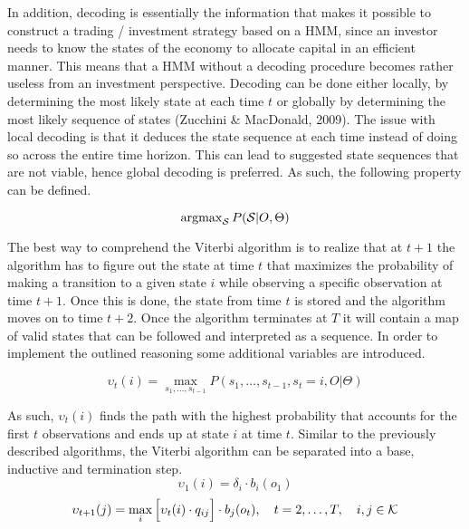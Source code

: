 In addition, decoding is essentially the information that makes it possible to construct a trading / investment strategy based on a HMM, since an investor needs to know the states of the economy to allocate capital in an efficient manner. This means that a HMM without a decoding procedure becomes rather useless from an investment perspective. Decoding can be done either locally, by determining the most likely state at each time $t$ or globally by determining the most likely sequence of states (Zucchini \& MacDonald, 2009). The issue with local decoding is that it deduces the state sequence at each time instead of doing so across the entire time horizon. This can lead to suggested state sequences that are not viable, hence global decoding is preferred. As such, the following property can be defined.

\begin{equation}
    \operatorname{argmax}_{\mathcal{S}}P(\mathcal{S}|O, \Theta)
    \label{eq: global decoding}
\end{equation}

The best way to comprehend the Viterbi algorithm is to realize that at $t+1$ the algorithm has to figure out the state at time $t$ that maximizes the probability of making a transition to a given state $i$ while observing a specific observation at time $t+1$. Once this is done, the state from time $t$ is stored and the algorithm moves on to time $t+2$. Once the algorithm terminates at $T$ it will contain a map of valid states that can be followed and interpreted as a sequence. In order to implement the outlined reasoning some additional variables are introduced.

\begin{equation}
    \upsilon_t(i) =   \max_{s_1,\ldots,s_{t-1}} P(s_1,\ldots,s_{t-1}, s_t=i, O | \Theta)
\end{equation}

As such, $\upsilon_t(i)$ finds the path with the highest probability that accounts for the first $t$ observations and ends up at state $i$ at time $t$. Similar to the previously described algorithms, the Viterbi algorithm can be separated into a base, inductive and termination step.
\begin{equation}
    \upsilon_1(i) = \delta_i \cdot b_i(o_1)
    \label{eq: viterbi start 1}
\end{equation}
\begin{equation}
    \upsilon_{t+1}(j) = \max_{i}\Big[\upsilon_t(i) \cdot q_{ij}\Big] \cdot b_j(o_t),
    \quad t=2,\ldots,T , \quad i,j \in \operatorname{\mathcal{K}} 
    \label{eq: inductive viterbi}
\end{equation}

